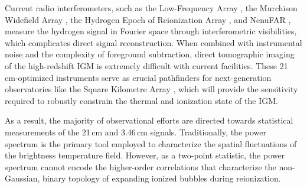 \documentclass[apj,twocolumn, appendixfloats, twocolappendix, numberedappendix, tighten]{openjournal}
\begin{document}
Current radio interferometers, such as the Low-Frequency Array \citep[LOFAR;][]{vanHaarlem2013, Acharya_2024lofar, Mertens2025}, the Murchison Widefield Array \citep[MWA;][]{Tingay2013, Bowman2013, Nunhokee2025, Trott2025}, the Hydrogen Epoch of Reionization Array \citep[HERA;][]{DeBoer2017, HERA2023, HERA2026}, and NenuFAR \citep{Munshi2024, Munshi2025}, measure the hydrogen signal in Fourier space through interferometric visibilities, which complicates direct signal reconstruction. When combined with instrumental noise and the complexity of foreground subtraction, direct tomographic imaging of the high-redshift IGM is extremely difficult with current facilities. These 21\,cm-optimized instruments serve as crucial pathfinders for next-generation observatories like the Square Kilometre Array \citep[SKA;][]{Koopmans2015, Chapman2015}, which will provide the sensitivity required to robustly constrain the thermal and ionization state of the IGM.




As a result, the majority of observational efforts are directed towards statistical measurements of the 21\,cm and 3.46\,cm signals. Traditionally, the power spectrum \citep[a two-point statistic; e.g.,][]{Zaldarriaga2004,Furlanetto2004b, Iliev2006, Lidz2008, Baek2010, Fialkov2014, Greig2015, Park2019, Seiler2019} is the primary tool employed to characterize the spatial fluctuations of the brightness temperature field. However, as a two-point statistic, the power spectrum cannot encode the higher-order correlations that characterize the non-Gaussian, binary topology of expanding ionized bubbles during reionization.
\end{document}
